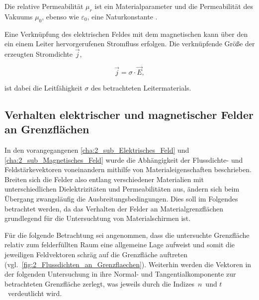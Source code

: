 Die relative Permeabilität $\mu_r$ ist ein Materialparameter und die Permeabilität des Vakuums $\mu_0$, ebenso wie $\varepsilon_0$, eine Naturkonstante \cite{EM_Schirmung}.
\par
\vspace{\linespace}
Eine Verknüpfung des elektrischen Feldes mit dem magnetischen kann über den ein einem Leiter hervorgerufenen Stromfluss erfolgen. Die verknüpfende Größe der erzeugten Stromdichte $\vec j$,

\begin{equation}
    \vec j = \sigma \cdot \vec E,
\end{equation}

ist dabei die Leitfähigkeit $\sigma$ des betrachteten Leitermaterials.


\subsection{Verhalten elektrischer und magnetischer Felder an Grenzflächen}\label{cha:2_sub_Verhalten_an_Grenzflächen}

In den vorangegangenen \Abschnitten \ref{cha:2_sub_Elektrisches_Feld} und \ref{cha:2_sub_Magnetisches_Feld} wurde die Abhängigkeit der Flussdichte- und Feldstärkevektoren voneinandern mithilfe von Materialeigenschaften beschrieben. Breiten sich die Felder also entlang verschiedener Materialien mit unterschiedlichen Dielektrizitäten und Permeabilitäten aus, ändern sich beim Übergang zwangsläufig die Ausbreitungsbedingungen. Dies soll im Folgendes betrachtet werden, da das Verhalten der Felder an Materialgrenzflächen grundlegend für die Untersuchtung von Materialschirmen ist. 
\par
\vspace{\linespace}
Für die folgende Betrachtung sei angenommen, dass die untersuchte Grenzfläche relativ zum felderfüllten Raum eine allgemeine Lage aufweist und somit die jeweiligen Feldvektoren schräg auf die Grenzfläche auftreten (vgl.~\Abb \ref{fig:2_Flussdichten_an_Grenzflaechen}). Weiterhin werden die Vektoren in der folgenden Untersuchung in ihre Normal- und Tangentialkomponente zur betrachteten Grenzfläche zerlegt, was jeweils durch die Indizes~\glqq$n$\grqq~und \glqq$t$\grqq~verdeutlicht wird. 

